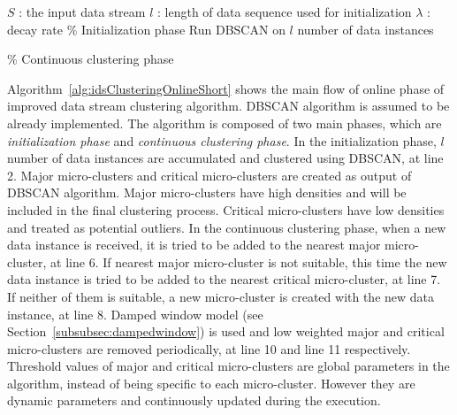 \documentclass[smallcondensed]{svjour3}     %
\begin{document}
\begin{algorithm}
	\caption{Improved data stream clustering online phase (S, $l$, $\lambda$)}
	\label{alg:idsClusteringOnlineShort}
	\begin{algorithmic}[1]
		\Require $S$ : the input data stream
		\Require $l$ : length of data sequence used for initialization
		\Require $\lambda$ : decay rate
		\State \% Initialization phase
		\State Run DBSCAN on $l$ number of data instances
		
		\State \% Continuous clustering phase
		
	\end{algorithmic}
\end{algorithm}

Algorithm~\ref{alg:idsClusteringOnlineShort} shows the main flow of online phase of improved data stream clustering algorithm. DBSCAN algorithm is assumed to be already implemented. The algorithm is composed of two main phases, which are \textit{initialization phase} and \textit{continuous clustering phase}. In the initialization phase, $l$ number of data instances are accumulated and clustered using DBSCAN, at line 2. Major micro-clusters and critical micro-clusters are created as output of DBSCAN algorithm. Major micro-clusters have high densities and will be included in the final clustering process. Critical micro-clusters have low densities and treated as potential outliers. In the continuous clustering phase, when a new data instance is received, it is tried to be added to the nearest major micro-cluster, at line 6. If nearest major micro-cluster is not suitable, this time the new data instance is tried to be added to the nearest critical micro-cluster, at line 7. If neither of them is suitable, a new micro-cluster is created with the new data instance, at line 8. Damped window model (see Section~\ref{subsubsec:dampedwindow}) is used and low weighted major and critical micro-clusters are removed periodically, at line 10 and line 11 respectively. Threshold values of major and critical micro-clusters are global parameters in the algorithm, instead of being specific to each micro-cluster. However they are dynamic parameters and continuously updated during the execution.
\end{document}
